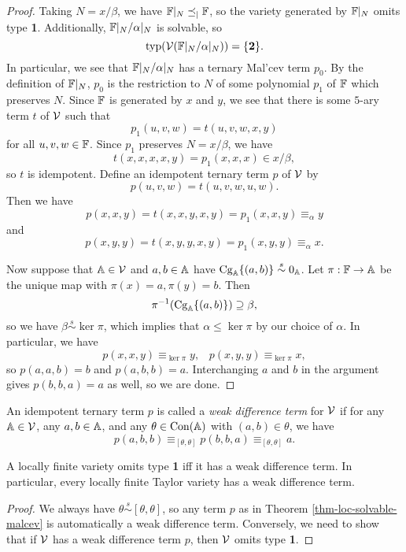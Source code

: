 \begin{appendices}
\begin{proof}
Taking $N = x/\beta$, we have $\mathbb{F}|_N \preceq_| \mathbb{F}$, so the variety generated by $\mathbb{F}|_N$ omits type \textbf{1}. Additionally, $\mathbb{F}|_N/\alpha|_N$ is solvable, so
\[
\operatorname{typ}(\mathcal{V}(\mathbb{F}|_N/\alpha|_N)) = \{\textbf{2}\}.
\]
In particular, we see that $\mathbb{F}|_N/\alpha|_N$ has a ternary Mal'cev term $p_0$. By the definition of $\mathbb{F}|_N$, $p_0$ is the restriction to $N$ of some polynomial $p_1$ of $\mathbb{F}$ which preserves $N$. Since $\mathbb{F}$ is generated by $x$ and $y$, we see that there is some $5$-ary term $t$ of $\mathcal{V}$ such that
\[
p_1(u,v,w) = t(u,v,w,x,y)
\]
for all $u,v,w \in \mathbb{F}$. Since $p_1$ preserves $N = x/\beta$, we have
\[
t(x,x,x,x,y) = p_1(x,x,x) \in x/\beta,
\]
so $t$ is idempotent. Define an idempotent ternary term $p$ of $\mathcal{V}$ by
\[
p(u,v,w) = t(u,v,w,u,w).
\]
Then we have
\[
p(x,x,y) = t(x,x,y,x,y) = p_1(x,x,y) \equiv_\alpha y
\]
and
\[
p(x,y,y) = t(x,y,y,x,y) = p_1(x,y,y) \equiv_\alpha x.
\]

Now suppose that $\mathbb{A} \in \mathcal{V}$ and $a,b \in \mathbb{A}$ have $\operatorname{Cg}_{\mathbb{A}}\{(a,b)\} \stackrel{s}{\sim} 0_{\mathbb{A}}$. Let $\pi : \mathbb{F} \rightarrow \mathbb{A}$ be the unique map with $\pi(x) = a, \pi(y) = b$. Then
\[
\pi^{-1}(\operatorname{Cg}_{\mathbb{A}}\{(a,b)\}) \supseteq \beta,
\]
so we have $\beta \stackrel{s}{\sim} \ker \pi$, which implies that $\alpha \le \ker \pi$ by our choice of $\alpha$. In particular, we have
\[
p(x,x,y) \equiv_{\ker \pi} y, \;\;\; p(x,y,y) \equiv_{\ker \pi} x,
\]
so $p(a,a,b) = b$ and $p(a,b,b) = a$. Interchanging $a$ and $b$ in the argument gives $p(b,b,a) = a$ as well, so we are done.
\end{proof}

\begin{defn} An idempotent ternary term $p$ is called a \emph{weak difference term} for $\mathcal{V}$ if for any $\mathbb{A} \in \mathcal{V}$, any $a,b \in \mathbb{A}$, and any $\theta \in \operatorname{Con}(\mathbb{A})$ with $(a,b) \in \theta$, we have
\[
p(a,b,b) \equiv_{[\theta,\theta]} p(b,b,a) \equiv_{[\theta,\theta]} a.
\]
\end{defn}

\begin{cor} A locally finite variety omits type \textbf{1} iff it has a weak difference term. In particular, every locally finite Taylor variety has a weak difference term.
\end{cor}
\begin{proof} We always have $\theta \stackrel{s}{\sim} [\theta,\theta]$, so any term $p$ as in Theorem \ref{thm-loc-solvable-malcev} is automatically a weak difference term. Conversely, we need to show that if $\mathcal{V}$ has a weak difference term $p$, then $\mathcal{V}$ omits type \textbf{1}.


\end{proof}
\end{appendices}
